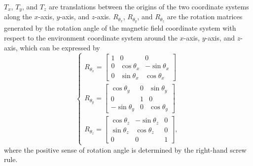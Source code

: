 \documentclass[journal]{IEEEtran}
\begin{document}
$T_{x}$, $T_{y}$, and $T_{z}$ are translations between the origins of the two coordinate systems along the $x$-axis, $y$-axis, and $z$-axis. 
$R_{\theta_x}$, $R_{\theta_y}$, and $R_{\theta_z}$ are the rotation matrices generated by the rotation angle of the magnetic field coordinate system with respect to the environment coordinate system around the $x$-axis, $y$-axis, and $z$-axis, which can be expressed by 
\begin{equation}
    \left\{\begin{array}{lr}
    R_{\theta_{x}} = \begin{bmatrix}
    1 & 0 & 0 \\
    0 & \cos\theta_{x} & -\sin\theta_{x} \\
    0 & \sin\theta_{x} & \cos\theta_{x} \end{bmatrix}
    \\
    R_{\theta_{y}} = \begin{bmatrix}
    \cos\theta_{y} & 0 & \sin\theta_{y} \\
    0 & 1 & 0 \\
    -\sin\theta_{y} & 0 & \cos\theta_{y} \end{bmatrix}
    \\
    R_{\theta_{z}} = \begin{bmatrix}
    \cos\theta_{z} & -\sin\theta_{z} & 0 \\
    \sin\theta_{z} & \cos\theta_{z} & 0 \\
    0 & 0 & 1 \end{bmatrix},
    \end{array}\right.
\label{rot-mat}
\end{equation}
where the positive sense of rotation angle is determined by the right-hand screw rule.
\end{document}
